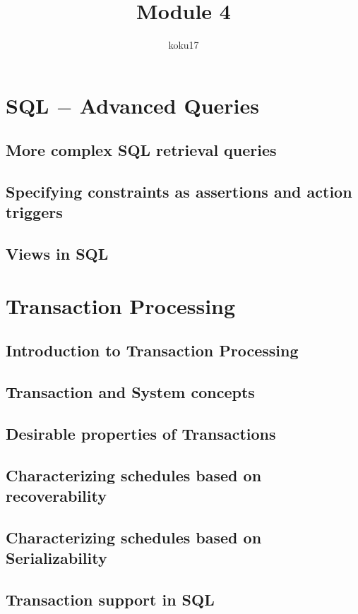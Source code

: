 \documentclass{article}
\title{Module 4}
\author{koku17}
\begin{document}
	\maketitle \thispagestyle{empty} \newpage
	\tableofcontents \thispagestyle{empty} \newpage
	\section{SQL $-$ Advanced Queries}
	\subsection{More complex SQL retrieval queries}
	\subsection{Specifying constraints as assertions and action triggers}
	\subsection{Views in SQL}

	\section{Transaction Processing}
	\subsection{Introduction to Transaction Processing}
	\subsection{Transaction and System concepts}
	\subsection{Desirable properties of Transactions}
	\subsection{Characterizing schedules based on recoverability}
	\subsection{Characterizing schedules based on Serializability}
	\subsection{Transaction support in SQL}
\end{document}

